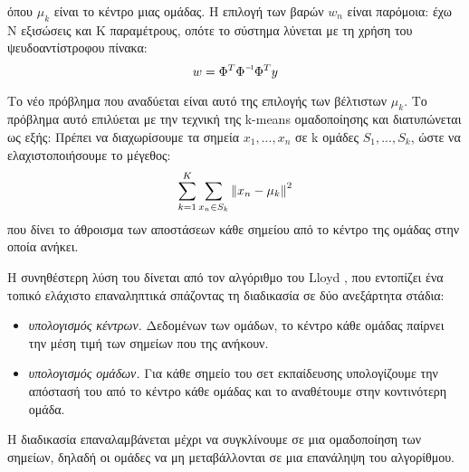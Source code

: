 όπου $\mu_k$ είναι το κέντρο μιας ομάδας. Η επιλογή των βαρών $w_n$ είναι παρόμοια: έχω Ν εξισώσεις και Κ παραμέτρους, οπότε το σύστημα λύνεται με τη χρήση του ψευδοαντίστροφου πίνακα:
\begin{equation}
w= \inv{\Phi^T \Phi} \Phi^T y
\end{equation}
	
	Το νέο πρόβλημα που αναδύεται είναι αυτό της επιλογής των βέλτιστων $\mu_k$. Το πρόβλημα αυτό επιλύεται με την τεχνική της k-means ομαδοποίησης και διατυπώνεται ως εξής: Πρέπει να διαχωρίσουμε τα σημεία $x_1,..., x_n$ σε k ομάδες $S_1,...,S_k$, ώστε να ελαχιστοποιήσουμε το μέγεθος:
	\begin{equation}
\sum_{k=1}^{K} \sum_{x_n \in S_k} \left\lVert x_n - \mu_k\right\rVert^2
\end{equation}
	που δίνει το άθροισμα των αποστάσεων κάθε σημείου από το κέντρο της ομάδας στην οποία ανήκει.
	
	Η συνηθέστερη λύση του δίνεται από τον αλγόριθμο του Lloyd \citet{Lloyd:2006:LSQ:2263356.2269955}, που εντοπίζει ένα τοπικό ελάχιστο επαναληπτικά σπάζοντας τη διαδικασία σε δύο ανεξάρτητα στάδια:
	\begin{itemize}
		\item \textit{υπολογισμός κέντρων.} Δεδομένων των ομάδων, το κέντρο κάθε ομάδας παίρνει την μέση τιμή των σημείων που της ανήκουν.
		\item \textit{υπολογισμός ομάδων.} Για κάθε σημείο του σετ εκπαίδευσης υπολογίζουμε την απόστασή του από το κέντρο κάθε ομάδας και το αναθέτουμε στην κοντινότερη ομάδα.
	\end{itemize}
	
	Η διαδικασία επαναλαμβάνεται μέχρι να συγκλίνουμε σε μια ομαδοποίηση των σημείων, δηλαδή οι ομάδες να μη μεταβάλλονται σε μια επανάληψη του αλγορίθμου.